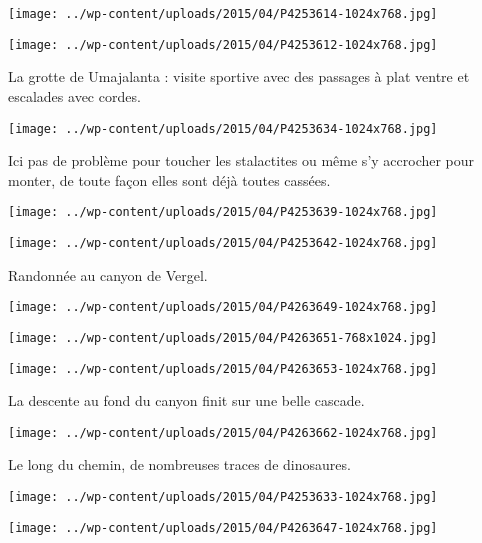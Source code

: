  \newline
\centerline{\texttt{[image: ../wp-content/uploads/2015/04/P4253614-1024x768.jpg]} } 
 \newline
 \newline
\centerline{\texttt{[image: ../wp-content/uploads/2015/04/P4253612-1024x768.jpg]} } 
 \newline
 La grotte de Umajalanta : visite sportive avec des passages à plat ventre et escalades avec cordes. \newline
 \newline
\centerline{\texttt{[image: ../wp-content/uploads/2015/04/P4253634-1024x768.jpg]} } 
 \newline
 Ici pas de problème pour toucher les stalactites ou même s'y accrocher pour monter, de toute façon elles sont déjà toutes cassées. \newline
 \newline
\centerline{\texttt{[image: ../wp-content/uploads/2015/04/P4253639-1024x768.jpg]} } 
 \newline
 \newline
\centerline{\texttt{[image: ../wp-content/uploads/2015/04/P4253642-1024x768.jpg]} } 
 \newline
 Randonnée au canyon de Vergel. \newline
 \newline
\centerline{\texttt{[image: ../wp-content/uploads/2015/04/P4263649-1024x768.jpg]} } 
 \newline
 \newline
\centerline{\texttt{[image: ../wp-content/uploads/2015/04/P4263651-768x1024.jpg]} } 
 \newline
 \newline
\centerline{\texttt{[image: ../wp-content/uploads/2015/04/P4263653-1024x768.jpg]} } 
 \newline
 La descente au fond du canyon finit sur une belle cascade. \newline
 \newline
\centerline{\texttt{[image: ../wp-content/uploads/2015/04/P4263662-1024x768.jpg]} } 
 \newline
 Le long du chemin, de nombreuses traces de dinosaures. \newline
 \newline
\centerline{\texttt{[image: ../wp-content/uploads/2015/04/P4253633-1024x768.jpg]} } 
 \newline
 \newline
\centerline{\texttt{[image: ../wp-content/uploads/2015/04/P4263647-1024x768.jpg]} } 
 \newline

\newpage
 
